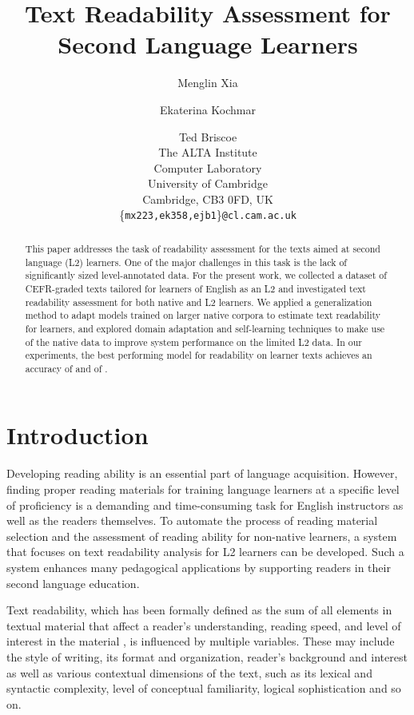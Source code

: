 \documentclass[11pt,letterpaper]{article}
\title{Text Readability Assessment for Second Language Learners}
\author{Menglin Xia \and Ekaterina Kochmar \and Ted Briscoe\\
	    The ALTA Institute\\
	    Computer Laboratory\\
	    University of Cambridge\\
	    Cambridge, CB3 0FD, UK\\
	    \{{\tt mx223,ek358,ejb1}\}{\tt @cl.cam.ac.uk}
}
\date{}
\begin{document}
\maketitle

\begin{abstract}

This paper addresses the task of readability assessment for the texts aimed at second language (L2) learners. One of the major challenges in this task is the lack of significantly sized level-annotated data. For the present work, we collected a dataset of CEFR-graded texts tailored for learners of English as an L2 and investigated text readability assessment for both native and L2 learners. We applied a generalization method to adapt models trained on larger native corpora to estimate text readability for learners, and explored domain adaptation and self-learning techniques to make use of the native data to improve system performance on the limited L2 data. In our experiments, the best performing model for readability on learner texts achieves an accuracy of  and  of . 

\end{abstract}

\section{Introduction}

Developing reading ability is an essential part of language acquisition. However, finding proper reading materials for training language learners at a specific level of proficiency is a demanding and time-consuming task for English instructors as well as the readers themselves. To automate the process of reading material selection and the assessment of reading ability for non-native learners, a system that focuses on text readability analysis for L2 learners can be developed. Such a system enhances many pedagogical applications by supporting readers in their second language education. 

Text readability, which has been formally defined as the sum of all elements in textual material that affect a reader's understanding, reading speed, and level of interest in the material \cite{dale1949concept}, is influenced by multiple variables. These may include the style of writing, its format and organization, reader's background and interest as well as various contextual dimensions of the text, such as its lexical and syntactic complexity, level of conceptual familiarity, logical sophistication and so on. 
\end{document}
